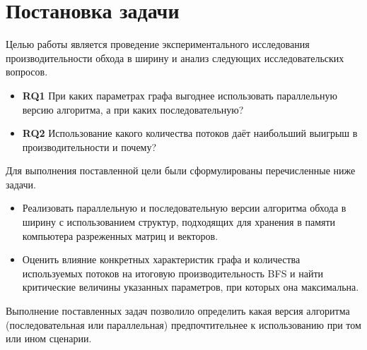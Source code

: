 
\section{Постановка задачи}
\label{sec:task}
Целью работы является проведение экспериментального исследования производительности обхода в ширину и анализ следующих исследовательских вопросов. 
 
\begin{itemize}
    \item{\textbf{RQ1}\label{rq1}} \newline
    При каких параметрах графа выгоднее использовать параллельную версию алгоритма, а при каких последовательную?
    \item{\textbf{RQ2}\label{rq2}} \newline
    Использование какого количества потоков даёт наибольший выигрыш в производительности и почему?
\end{itemize}

 Для выполнения поставленной цели были сформулированы перечисленные ниже задачи.
 \begin{itemize}
 	\item Реализовать параллельную и последовательную версии алгоритма обхода в ширину с использованием структур, подходящих для хранения в памяти компьютера разреженных матриц и векторов.
 	\item  Оценить влияние конкретных характеристик графа и количества используемых потоков на итоговую производительность BFS и найти критические величины указанных параметров, при которых она максимальна.
 \end{itemize}

Выполнение поставленных задач позволило определить какая версия алгоритма (последовательная или параллельная) предпочтительнее к использованию при том или ином сценарии.
